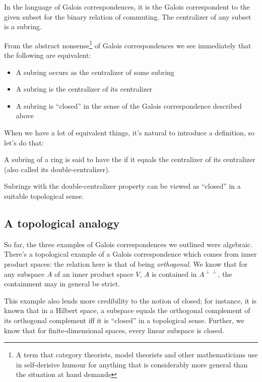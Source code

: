 \documentclass[a4paper]{amsart}
\begin{document}
In the language of Galois correspondences, it is the Galois
correspondent to the given subset for the binary relation of
commuting. The centralizer of any subset is a subring.

From the abstract nonsense\footnote{A term that category
  theorists, model theorists and other mathematicians use in
  self-derisive humour for anything that is considerably more general
  than the situation at hand demands} of Galois correspondences we see
immediately that the following are equivalent:

\begin{itemize}

\item A subring occurs as the centralizer of some subring

\item A subring is the centralizer of its centralizer

\item A subring is ``closed'' in the sense of the Galois
  correspondence described above
\end{itemize}

When we have a lot of equivalent things, it's natural to introduce a
definition, so let's do that:

\begin{definer}
  A subring of a ring is said to have the
   if it equals the
  centralizer of its centralizer (also called its double-centralizer).
\end{definer}

Subrings with the double-centralizer property can be viewed as
``closed'' in a suitable topological sense.

\subsection{A topological analogy}

So far, the three examples of Galois correspondences we outlined were
algebraic. There's a topological example of a Galois correspondence
which comes from inner product spaces: the relation here is that of
being {\em orthogonal}. We know that for any subspace $A$ of an inner
product space $V$, $A$ is contained in $A^{\perp\perp}$, the
containment may in general be strict.

This example also lends more credibility to the notion of closed; for
instance, it is known that in a Hilbert space, a subspace equals the
orthogonal complement of its orthogonal complement iff it is
``closed'' in a topological sense. Further, we know that for
finite-dimensional spaces, every linear subspace is closed.
\end{document}
